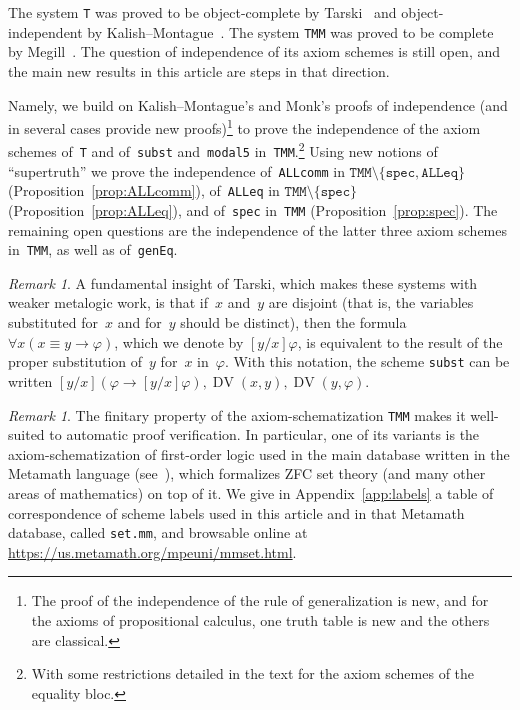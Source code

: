 \documentclass[11pt]{article}
\renewcommand*{\phi}{\varphi}
\DeclareMathOperator{\DV}{DV}
\theoremstyle{plain}
\theoremstyle{definition}
\theoremstyle{remark}
\newtheorem{remark}[theorem]{Remark}
\begin{document}
The system \texttt{T} was proved to be object-complete by Tarski~\cite{tarski} and
object-independent by Kalish--Montague~\cite{km}.
The system \texttt{TMM} was proved to be complete by Megill~\cite{megill}.
The question of independence of its axiom schemes is still open, and the main new results in this
article are steps in that direction.

Namely, we build on Kalish--Montague's and Monk's proofs of independence (and in several cases provide
new proofs)\footnote{The proof of the independence of the rule of generalization is new, and for
the axioms of propositional calculus, one truth table is new and the others are classical.} to
prove the independence of the axiom schemes of~\texttt{T} and of~\texttt{subst} and~\texttt{modal5}
in~\texttt{TMM}.\footnote{
With some restrictions detailed in the text for the axiom schemes of the equality bloc.}
Using new notions of ``supertruth\rlap{,}'' we prove the independence
of~\texttt{ALLcomm} in $\texttt{TMM} \setminus \{\texttt{spec}, \texttt{ALLeq}\}$
(Proposition~\ref{prop:ALLcomm}),
of~\texttt{ALLeq} in $\texttt{TMM} \setminus \{\texttt{spec}\}$
(Proposition~\ref{prop:ALLeq}),
and of~\texttt{spec} in~\texttt{TMM}
(Proposition~\ref{prop:spec}).
The remaining open questions are the independence of the latter three axiom schemes in~\texttt{TMM},
as well as of~\texttt{genEq}.

\begin{remark}
A fundamental insight of Tarski, which makes these systems with weaker metalogic work, is that
if~$x$ and~$y$ are disjoint (that is, the variables substituted for~$x$ and for~$y$ should be
distinct), then the formula $\forall x (x \equiv y \to \phi)$, which we denote by $[y/x]\phi$,
is equivalent to the result of the proper substitution of~$y$ for~$x$ in~$\phi$.
With this notation, the scheme \texttt{subst} can be written
$[y/x](\phi \to [y/x]\phi), \DV(x, y), \DV(y, \phi)$.
\end{remark}

\begin{remark}\label{rmk:mpe}
The finitary property of the axiom-schematization \texttt{TMM} makes it well-suited to
automatic proof verification.
In particular, one of its variants is the axiom-schematization of first-order logic used in the
main database written in the Metamath language (see~\cite[Appendix C]{metamath}), which
formalizes ZFC set theory (and many other areas of mathematics) on top of it.
We give in Appendix~\ref{app:labels} a table of correspondence of scheme labels used in this
article and in that Metamath database, called \texttt{set.mm}, and browsable online at
\url{https://us.metamath.org/mpeuni/mmset.html}.
\end{remark}
\end{document}

